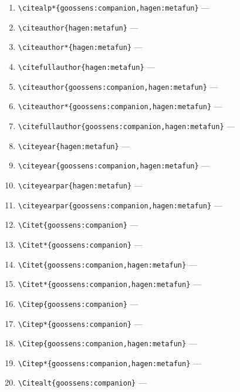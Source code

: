 \documentclass[12pt]{article}
\begin{document}
\begin{enumerate}
\item
\verb|\citealp*{goossens:companion,hagen:metafun}| ---  
\citealp*{goossens:companion,hagen:metafun}
\item
\verb|\citeauthor{hagen:metafun}| ---  
\citeauthor{hagen:metafun}
\item
\verb|\citeauthor*{hagen:metafun}| ---  
\citeauthor*{hagen:metafun}
\item
\verb|\citefullauthor{hagen:metafun}| ---  
\item
\verb|\citeauthor{goossens:companion,hagen:metafun}| ---  
\citeauthor{goossens:companion,hagen:metafun}
\item
\verb|\citeauthor*{goossens:companion,hagen:metafun}| ---  
\citeauthor*{goossens:companion,hagen:metafun}
\item
\verb|\citefullauthor{goossens:companion,hagen:metafun}| ---  
\item
\verb|\citeyear{hagen:metafun}| ---  
\citeyear{hagen:metafun}
\item
\verb|\citeyear{goossens:companion,hagen:metafun}| ---  
\citeyear{goossens:companion,hagen:metafun}
\item
\verb|\citeyearpar{hagen:metafun}| ---  
\citeyearpar{hagen:metafun}
\item
\verb|\citeyearpar{goossens:companion,hagen:metafun}| ---  
\citeyearpar{goossens:companion,hagen:metafun}
\item
\verb|\Citet{goossens:companion}| ---  
\item
\verb|\Citet*{goossens:companion}| ---  
\item
\verb|\Citet{goossens:companion,hagen:metafun}| ---  
\item
\verb|\Citet*{goossens:companion,hagen:metafun}| ---  
\item
\verb|\Citep{goossens:companion}| ---  
\item
\verb|\Citep*{goossens:companion}| ---  
\item
\verb|\Citep{goossens:companion,hagen:metafun}| ---  
\item
\verb|\Citep*{goossens:companion,hagen:metafun}| ---  
\item
\verb|\Citealt{goossens:companion}| ---  

\end{enumerate}
\end{document}
